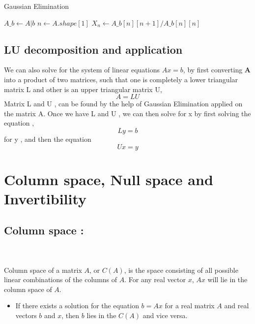 \documentclass[12pt]{article}
\begin{document}
\begin{algorithm}
\caption{Gaussian Elimination}
$A\_b \gets A|b$\;
$n \gets A.shape[1]$\;
$X_n \gets A\_b[n][n+1]/A\_b[n][n]$\;
\end{algorithm}

\subsection{LU decomposition and application}
We can also solve for the system of linear equations $Ax  = b$, by first converting $\mathbf{A}$ into a product of two matrices, such that one is completely a lower triangular matrix L and other is an upper triangular matrix U,
$$
A = LU$$
Matrix L and U , can be found by the help of Gaussian Elimination applied on the matrix A. Once we have L and U , we can then solve for x by first solving the equation , $$
L y = b$$
for y , and then the equation $$
Ux = y$$
\section{Column space, Null space and Invertibility}

\subsection{Column space :}\\ \\
Column space of a matrix $A$, or $C(A)$, is the space consisting of all possible linear combinations of the columns of $A$. For any real vector $x$, $Ax$ will lie in the column space of $A$.

\begin{itemize}
    \item If there exists a solution for the equation $b = Ax$ for a real matrix $A$ and real vectors $b$ and $x$,  then $b$ lies in the $C(A)$ and vice versa.
\end{itemize}
\\ \\
\end{document}
